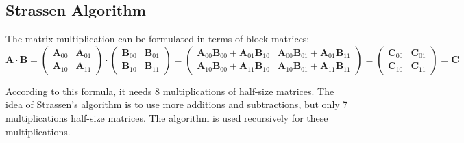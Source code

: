 \documentclass{article}
\begin{document}
\subsection{Strassen Algorithm}

The matrix multiplication can be formulated in terms of block matrices:
$$
\mathbf{A} \cdot \mathbf{B} =
\begin{pmatrix}
\mathbf{A}_{00} & \mathbf{A}_{01} \\
\mathbf{A}_{10} & \mathbf{A}_{11} 
\end{pmatrix}
\cdot
\begin{pmatrix}
\mathbf{B}_{00} & \mathbf{B}_{01} \\
\mathbf{B}_{10} & \mathbf{B}_{11} 
\end{pmatrix}
=
\begin{pmatrix}
\mathbf{A}_{00}\mathbf{B}_{00}+\mathbf{A}_{01}\mathbf{B}_{10} & \mathbf{A}_{00}\mathbf{B}_{01}+\mathbf{A}_{01}\mathbf{B}_{11} \\
\mathbf{A}_{10}\mathbf{B}_{00}+\mathbf{A}_{11}\mathbf{B}_{10} & \mathbf{A}_{10}\mathbf{B}_{01}+\mathbf{A}_{11}\mathbf{B}_{11} 
\end{pmatrix}
=
\begin{pmatrix}
\mathbf{C}_{00} & \mathbf{C}_{01} \\
\mathbf{C}_{10} & \mathbf{C}_{11} 
\end{pmatrix}
= \mathbf{C}
$$

According to this formula, it needs 8 multiplications of half-size matrices. 
The idea of Strassen's algorithm is to use more additions and subtractions,
but only 7 multiplications half-size matrices. The algorithm is used recursively
for these multiplications.
\end{document}
